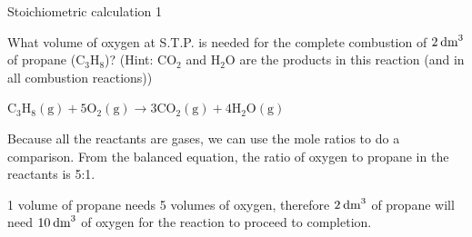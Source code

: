 \label{m38712*secfhsst!!!underscore!!!id1903}\vspace{-2cm}  
      \begin{wex}{Stoichiometric calculation 1 }
{

      \label{m38712*probfhsst!!!underscore!!!id1904}
      \label{m38712*id275479}What volume of oxygen at S.T.P. is needed for the complete combustion of $2\phantom{\rule{2pt}{0ex}}{\text{dm}}^{3}$ of propane ($\text{C}{}_{3}\text{H}{}_{8}$)? (Hint: $\text{CO}{}_{2}$ and $\text{H}{}_{2}\text{O}$ are the products in this reaction (and in all combustion reactions))
      \vspace{5pt}}
{
      \label{m38712*id284189}${\text{C}}_{3}{\text{H}}_{8}\left(\text{g}\right)+5{\text{O}}_{2}\left(\text{g}\right)\to 3\text{C}{\text{O}}_{2}\left(\text{g}\right)+4{\text{H}}_{2}\text{O}\left(\text{g}\right)$
       
      \label{m38712*id284294}Because all the reactants are gases, we can use the mole ratios to do a comparison. From the balanced equation, the ratio of oxygen to propane in the reactants is 5:1.\par 
      \label{m38712*id284304}1 volume of propane needs 5 volumes of oxygen, therefore $2\phantom{\rule{2pt}{0ex}}{\text{dm}}^{3}$ of propane will need $10\phantom{\rule{2pt}{0ex}}{\text{dm}}^{3}$ of oxygen for the reaction to proceed to completion. 
}
    \end{wex}
    \noindent
\label{m38712*secfhsst!!!underscore!!!id1972}\vspace{-2cm} 
